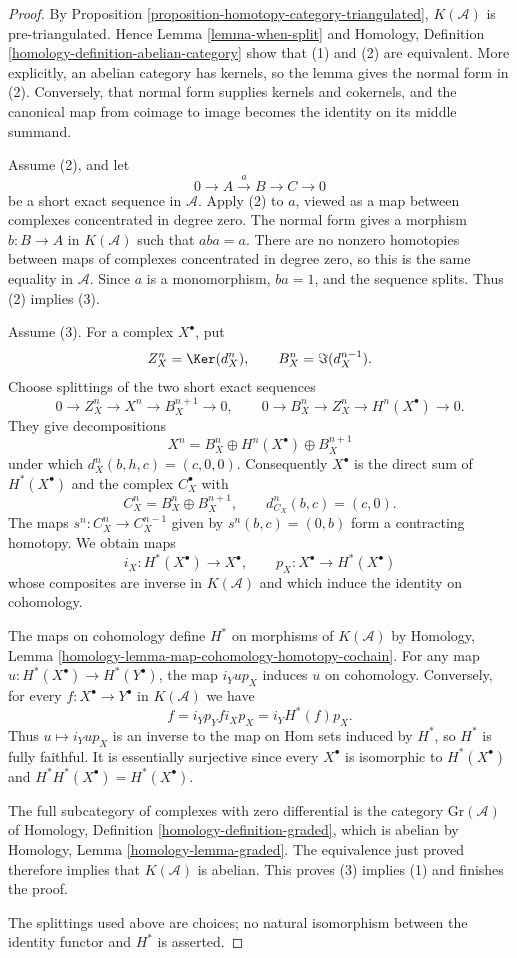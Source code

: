 \begin{proof}
By Proposition \ref{proposition-homotopy-category-triangulated},
$K(\mathcal{A})$ is pre-triangulated. Hence Lemma
\ref{lemma-when-split} and
Homology, Definition \ref{homology-definition-abelian-category}
show that (1) and (2) are equivalent. More explicitly, an abelian
category has kernels, so the lemma gives the normal form in (2).
Conversely, that normal form supplies kernels and cokernels, and the
canonical map from coimage to image becomes the identity on its middle
summand.

Assume (2), and let
$$
0 \longrightarrow A \xrightarrow{a} B \longrightarrow C
\longrightarrow 0
$$
be a short exact sequence in $\mathcal{A}$. Apply (2) to $a$, viewed as
a map between complexes concentrated in degree zero. The normal form gives
a morphism $b : B \to A$ in $K(\mathcal{A})$ such that $aba = a$.
There are no nonzero homotopies between maps of complexes concentrated in
degree zero, so this is the same equality in $\mathcal{A}$. Since $a$ is
a monomorphism, $ba = 1$, and the sequence splits. Thus (2) implies (3).

Assume (3). For a complex $X^\bullet$, put
$$
Z_X^n = \Ker(d_X^n), \qquad B_X^n = \Im(d_X^{n - 1}).
$$
Choose splittings of the two short exact sequences
$$
0 \longrightarrow Z_X^n \longrightarrow X^n \longrightarrow
B_X^{n + 1} \longrightarrow 0,
\qquad
0 \longrightarrow B_X^n \longrightarrow Z_X^n \longrightarrow
H^n(X^\bullet) \longrightarrow 0.
$$
They give decompositions
$$
X^n = B_X^n \oplus H^n(X^\bullet) \oplus B_X^{n + 1}
$$
under which $d_X^n(b, h, c) = (c, 0, 0)$. Consequently $X^\bullet$
is the direct sum of $H^*(X^\bullet)$ and the complex $C_X^\bullet$ with
$$
C_X^n = B_X^n \oplus B_X^{n + 1}, \qquad
d_{C_X}^n(b, c) = (c, 0).
$$
The maps $s^n : C_X^n \to C_X^{n - 1}$ given by
$s^n(b, c) = (0, b)$ form a contracting homotopy. We obtain maps
$$
i_X : H^*(X^\bullet) \longrightarrow X^\bullet, \qquad
p_X : X^\bullet \longrightarrow H^*(X^\bullet)
$$
whose composites are inverse in $K(\mathcal{A})$ and which induce the
identity on cohomology.

The maps on cohomology define $H^*$ on morphisms of $K(\mathcal{A})$ by
Homology, Lemma
\ref{homology-lemma-map-cohomology-homotopy-cochain}. For any map
$u : H^*(X^\bullet) \to H^*(Y^\bullet)$, the map
$i_Y u p_X$ induces $u$ on cohomology. Conversely, for every
$f : X^\bullet \to Y^\bullet$ in $K(\mathcal{A})$ we have
$$
f = i_Y p_Y f i_X p_X = i_Y H^*(f) p_X.
$$
Thus $u \mapsto i_Y u p_X$ is an inverse to the map on Hom sets induced
by $H^*$, so $H^*$ is fully faithful. It is essentially surjective since
every $X^\bullet$ is isomorphic to $H^*(X^\bullet)$ and
$H^*H^*(X^\bullet) = H^*(X^\bullet)$.

The full subcategory of complexes with zero differential is the category
$\text{Gr}(\mathcal{A})$ of
Homology, Definition \ref{homology-definition-graded}, which is abelian by
Homology, Lemma \ref{homology-lemma-graded}. The equivalence just proved
therefore implies that $K(\mathcal{A})$ is abelian. This proves (3)
implies (1) and finishes the proof.

The splittings used above are choices; no natural isomorphism between the
identity functor and $H^*$ is asserted.
\end{proof}
